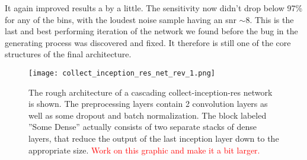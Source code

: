 It again improved results a by a little. The sensitivity now didn't drop below 97\% for any of the bins, with the loudest noise sample having an \gls{snr} $\sim 8$. This is the last and best performing iteration of the network we found before the bug in the generating process was discovered and fixed. It therefore is still one of the core structures of the final architecture.\medskip\\
\begin{figure}
\centering
\texttt{[image: collect\_inception\_res\_net\_rev\_1.png]}
\caption[Cascading architecture of a collect-inception-res network]{The rough architecture of a cascading collect-inception-res network is shown. The preprocessing layers contain 2 convolution layers as well as some dropout and batch normalization. The block labeled ''Some Dense'' actually consists of two separate stacks of dense layers, that reduce the output of the last inception layer down to the appropriate size. \textcolor{red}{Work on this graphic and make it a bit larger.}}\label{fig:cascade_inception_res_net}
\end{figure}

